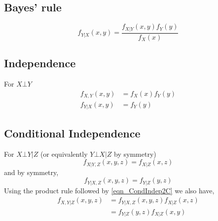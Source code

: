 \subsection{Bayes' rule}

\begin{equation} \label{eqn_BayesRuleC}
f_{Y|X}(x,y) = \frac{f_{X|Y}(x,y) f_Y(y)}{f_X(x)}
\end{equation}

\subsection{Independence}

For $X \bot Y$
\begin{align}
f_{X,Y}(x,y) & = f_X(x)f_Y(y) \label{eqn_Indep1C} \\
f_{Y|X}(x,y) & = f_Y(y)       \label{eqn_Indep2C}
\end{align}

\subsection{Conditional Independence}

For $X \bot Y | Z$ (or equivalently $Y \bot X | Z$ by symmetry)
\begin{equation} \label{eqn_CondIndep1C}
f_{X|Y,Z}(x,y,z) = f_{X|Z}(x,z)
\end{equation}
and by symmetry,
\begin{equation} \label{eqn_CondIndep2C}
f_{Y|X,Z}(x,y,z) = f_{Y|Z}(y,z)
\end{equation}
Using the product rule followed by \ref{eqn_CondIndep2C} we also have,
\begin{align}
f_{X,Y|Z}(x,y,z) & = f_{Y|X,Z}(x,y,z)f_{X|Z}(x,z) \nonumber \\
                 & = f_{Y|Z}(y,z)f_{X|Z}(x,y)  \label{eqn_CondIndep3C}
\end{align}

